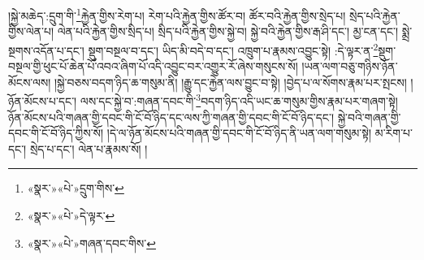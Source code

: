 །སྐྱེ་མཆེད་:དྲུག་གི་\footnote{«སྣར་»«པེ་»དྲུག་གིས་}རྐྱེན་གྱིས་རེག་པ། རེག་པའི་རྐྱེན་གྱིས་ཚོར་བ། ཚོར་བའི་རྐྱེན་གྱིས་སྲེད་པ། སྲེད་པའི་རྐྱེན་གྱིས་ལེན་པ། ལེན་པའི་རྐྱེན་གྱིས་སྲིད་པ། སྲིད་པའི་རྐྱེན་གྱིས་སྐྱེ་བ། སྐྱེ་བའི་རྐྱེན་གྱིས་རྒ་ཤི་དང་། མྱ་ངན་དང་། སྨྲེ་སྔགས་འདོན་པ་དང་། སྡུག་བསྔལ་བ་དང་། ཡིད་མི་བདེ་བ་དང་། འཁྲུག་པ་རྣམས་འབྱུང་སྟེ། :དེ་ལྟར་ན་\footnote{«སྣར་»«པེ་»དེ་ལྟར་}སྡུག་བསྔལ་གྱི་ཕུང་པོ་ཆེན་པོ་འབའ་ཞིག་པོ་འདི་འབྱུང་བར་འགྱུར་རོ་ཞེས་གསུངས་སོ། །ཡན་ལག་བཅུ་གཉིས་ཉོན་མོངས་ལས། །སྐྱེ་བཅས་བདག་ཉིད་ཆ་གསུམ་ནི། །རྒྱུ་དང་རྐྱེན་ལས་བྱུང་བ་སྟེ། །བྱེད་པ་ལ་སོགས་རྣམ་པར་སྤངས། །ཉོན་མོངས་པ་དང་། ལས་དང་སྐྱེ་བ་:གཞན་དབང་གི་\footnote{«སྣར་»«པེ་»གཞན་དབང་གིས་}བདག་ཉིད་འདི་ཡང་ཆ་གསུམ་གྱིས་རྣམ་པར་གཞག་སྟེ། ཉོན་མོངས་པའི་གཞན་གྱི་དབང་གི་ངོ་བོ་ཉིད་དང་ལས་ཀྱི་གཞན་གྱི་དབང་གི་ངོ་བོ་ཉིད་དང་། སྐྱེ་བའི་གཞན་གྱི་དབང་གི་ངོ་བོ་ཉིད་ཀྱིས་སོ། །དེ་ལ་ཉོན་མོངས་པའི་གཞན་གྱི་དབང་གི་ངོ་བོ་ཉིད་ནི་ཡན་ལག་གསུམ་སྟེ། མ་རིག་པ་དང་། སྲེད་པ་དང་། ལེན་པ་རྣམས་སོ། །

